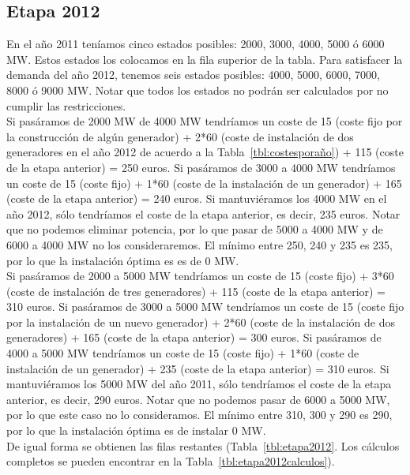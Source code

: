 \documentclass[12pt,a4paper,twoside,openright,titlepage,final]{article}
\begin{document}
\subsection{Etapa 2012}

En el año 2011 teníamos cinco estados posibles: 2000, 3000, 4000, 5000 ó 6000 MW. Estos estados los colocamos en la fila superior de la tabla. Para satisfacer la demanda del año 2012, tenemos seis estados posibles: 4000, 5000, 6000, 7000, 8000 ó 9000 MW. Notar que todos los estados no podrán ser calculados por no cumplir las restricciones.\\

Si pasáramos de 2000 MW de 4000 MW tendríamos un coste de 15 (coste fijo por la construcción de algún generador) + 2*60 (coste de instalación de dos generadores en el año 2012 de acuerdo a la Tabla~\ref{tbl:costesporaño}) + 115 (coste de la etapa anterior) = 250 euros. Si pasáramos de 3000 a 4000 MW tendríamos un coste de 15 (coste fijo) + 1*60 (coste de la instalación de un generador) + 165 (coste de la etapa anterior) = 240 euros. Si mantuviéramos los 4000 MW en el año 2012, sólo tendríamos el coste de la etapa anterior, es decir, 235 euros. Notar que no podemos eliminar potencia, por lo que pasar de 5000 a 4000 MW y de 6000 a 4000 MW no los consideraremos. El mínimo entre 250, 240 y 235 es 235, por lo que la instalación óptima es es de 0 MW.\\

Si pasáramos de 2000 a 5000 MW tendríamos un coste de 15 (coste fijo) + 3*60 (coste de instalación de tres generadores) + 115 (coste de la etapa anterior) = 310 euros. Si pasáramos de 3000 a 5000 MW tendríamos un coste de 15 (coste fijo por la instalación de un nuevo generador) + 2*60 (coste de la instalación de dos generadores) + 165 (coste de la etapa anterior) = 300 euros. Si pasáramos de 4000 a 5000 MW tendríamos un coste de 15 (coste fijo) + 1*60 (coste de instalación de un generador) + 235 (coste de la etapa anterior) = 310 euros. Si mantuviéramos los 5000 MW del año 2011, sólo tendríamos el coste de la etapa anterior, es decir, 290 euros. Notar que no podemos pasar de 6000 a 5000 MW, por lo que este caso no lo consideramos. El mínimo entre 310, 300 y 290 es 290, por lo que la instalación óptima es de instalar 0 MW.\\

De igual forma se obtienen las filas restantes (Tabla~\ref{tbl:etapa2012}. Los cálculos completos se pueden encontrar en la Tabla~\ref{tbl:etapa2012calculos}).\\
\end{document}
